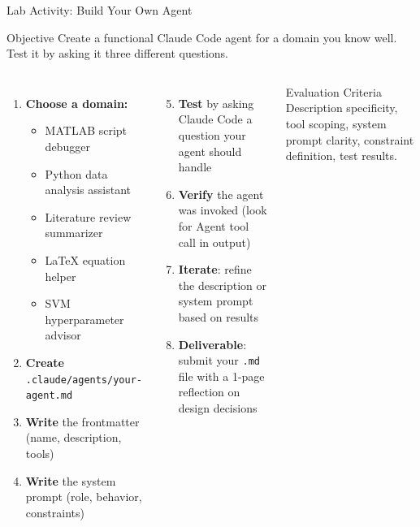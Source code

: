 \documentclass[aspectratio=169,xcolor=dvipsnames]{beamer}
\begin{document}
\begin{frame}{Lab Activity: Build Your Own Agent}
    \begin{block}{Objective}
        Create a functional Claude Code agent for a domain you know well. Test it by asking it three different questions.
    \end{block}

    \begin{columns}
        \begin{enumerate}
            \item \textbf{Choose a domain:}
                \begin{itemize}
                    \item MATLAB script debugger
                    \item Python data analysis assistant
                    \item Literature review summarizer
                    \item LaTeX equation helper
                    \item SVM hyperparameter advisor
                \end{itemize}
            \item \textbf{Create} \texttt{.claude/agents/your-agent.md}
            \item \textbf{Write} the frontmatter (name, description, tools)
            \item \textbf{Write} the system prompt (role, behavior, constraints)
        \end{enumerate}

        \begin{enumerate}
            \setcounter{enumi}{4}
            \item \textbf{Test} by asking Claude Code a question your agent should handle
            \item \textbf{Verify} the agent was invoked (look for Agent tool call in output)
            \item \textbf{Iterate}: refine the description or system prompt based on results
            \item \textbf{Deliverable}: submit your \texttt{.md} file with a 1-page reflection on design decisions
        \end{enumerate}
        \begin{alertblock}{Evaluation Criteria}
            Description specificity, tool scoping, system prompt clarity, constraint definition, test results.
        \end{alertblock}
    \end{columns}
\end{frame}
\end{document}
